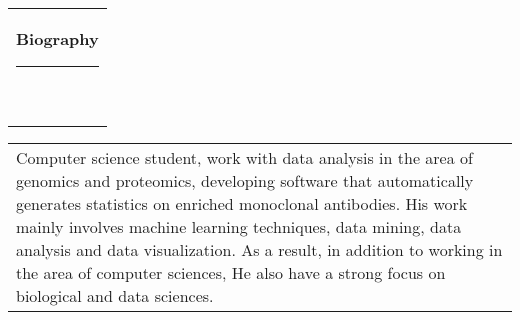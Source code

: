 \documentclass[10pt,A4,english]{article}
\newcommand*{\vcenteredhbox}[1]{\begingroup
\setbox0=\hbox{#1}\parbox{\wd0}{\box0}\endgroup}
\newcommand{\icon}[3] { 							
	\makebox(#2, #2){\textcolor{maincol}{\csname fa#1\endcsname}}
}
\newcommand{\icontext}[4]{ 						
	\vcenteredhbox{\icon{#1}{#2}{#3}}  \hspace{2pt}  \parbox{0.9\mpwidth}{\textcolor{#4}{#3}}
}
\newcommand{\mpwidth}{\linewidth-\fboxsep-\fboxsep}
\newcommand{\cvtext}[1] {
	\begin{tabular*}{1\mpwidth}{p{0.98\mpwidth}}
		\parbox{1\mpwidth}{#1}
	\end{tabular*}
}
\newcommand{\cvsection}[1] {
	\vspace{14pt}
	\cvtext{
		\textbf{\LARGE{\textcolor{darkcol}{#1}}}\\[-4pt]
		\textcolor{accentcol}{ \rule{0.2\textwidth}{1.5pt} } \\
	}
}
\newcommand{\cvqrcode}[1] {
	\begin{center}
		\texttt{[image: qrcode]}
	\end{center}
}
\begin{document}
\begin{paracol}{2}
\begin{leftcolumn}









\end{leftcolumn}
\begin{rightcolumn}


\cvsection{Biography}
\vspace{4pt}

\cvtext{

  Computer science student, work with data analysis in the area of genomics and
  proteomics, developing software that automatically generates statistics on
  enriched monoclonal antibodies. His work mainly involves machine learning
  techniques, data mining, data analysis and data visualization. As a result, in
  addition to working in the area of computer sciences, He also have a strong
  focus on biological and data sciences.\\[-8pt]

}
\end{rightcolumn}
\end{paracol}
\end{document}
